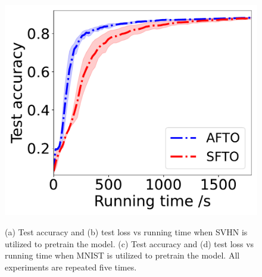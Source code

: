 \documentclass[letterpaper]{article} %
\begin{document}
\begin{figure}[t]
{\begin{minipage}{4.2cm}
\label{fig:dis-pre-mnist-acc}
\includegraphics[scale=0.215]{dis-mnist-acc.pdf}
\end{minipage}}
\caption{(a) Test accuracy and (b) test loss vs running time when SVHN is utilized to pretrain the model. (c) Test accuracy and (d) test loss vs running time  when MNIST is utilized to pretrain the model. All experiments are repeated five times.} %
\label{fig:dis-domain}
\end{figure}
\end{document}
